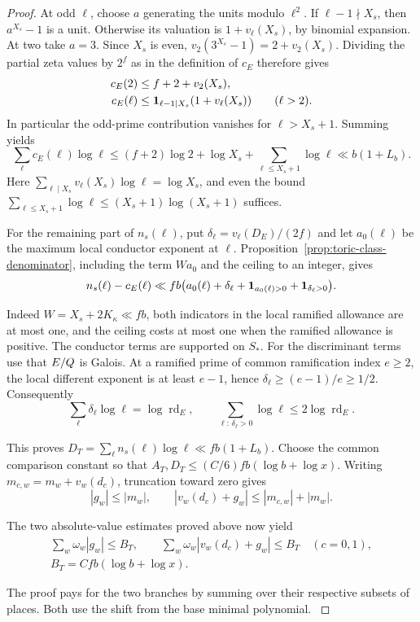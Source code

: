\begin{proof}
At odd \(\ell\), choose \(a\) generating the units modulo \(\ell^2\).
If \(\ell-1\nmid X_s\), then \(a^{X_s}-1\) is a unit. Otherwise
its valuation is \(1+v_\ell(X_s)\), by binomial expansion. At two
take \(a=3\). Since \(X_s\) is even,
\(v_2(3^{X_s}-1)=2+v_2(X_s)\). Dividing the partial zeta values
by \(2^f\) as in the definition of \(c_E\) therefore gives
\[
 \begin{split}
 c_E(2)&\le f+2+v_2(X_s),\\
 c_E(\ell)&\le {\bf1}_{\ell-1\mid X_s}(1+v_\ell(X_s))
                   \qquad(\ell>2).
 \end{split}
\]
In particular the odd-prime contribution vanishes for
\(\ell>X_s+1\). Summing yields
\[
 \sum_\ell c_E(\ell)\log\ell
 \le (f+2)\log2 + \log X_s+\sum_{\ell\le X_s+1}\log\ell
 \ll b(1+L_b).
\]
Here \(\sum_{\ell\mid X_s}v_\ell(X_s)\log\ell=\log X_s\), and
even the bound \(\sum_{\ell\le X_s+1}\log\ell\le(X_s+1)\log(X_s+1)\)
suffices.

For the remaining part of \(n_s(\ell)\), put
\(\delta_\ell=v_\ell(D_E)/(2f)\) and let \(a_0(\ell)\) be the
maximum local conductor exponent at \(\ell\).
Proposition~\ref{prop:toric-class-denominator}, including the term
\(Wa_0\) and the ceiling to an integer, gives
\[
 n_s(\ell)-c_E(\ell)\ll
 fb\bigl(a_0(\ell)+\delta_\ell+
 {\bf1}_{a_0(\ell)>0}+{\bf1}_{\delta_\ell>0}\bigr).
\]

Indeed \(W=X_s+2K_\kappa\ll fb\), both indicators in the local
ramified allowance are at most one, and the ceiling costs at most one
when the ramified allowance is positive. The conductor terms are
supported on \(S_*\). For the discriminant terms use that \(E/Q\)
is Galois. At a ramified prime of common ramification index
\(e\ge2\), the local different exponent is at least \(e-1\), hence
\(\delta_\ell\ge(e-1)/e\ge1/2\). Consequently
\[
 \sum_\ell \delta_\ell\log\ell=\log\operatorname{rd}_E,
 \qquad
 \sum_{\ell:\,\delta_\ell>0}\log\ell\le2\log\operatorname{rd}_E .
\]

This proves \(D_T=\sum_\ell n_s(\ell)\log\ell\ll fb(1+L_b)\).
Choose the common comparison constant so that
\(A_T,D_T\le(C/6)fb(\log b+\log x)\).
Writing \(m_{c,w}=m_w+v_w(d_c)\), truncation toward zero gives
\[
 |g_w|\le|m_w|,\qquad
 |v_w(d_c)+g_w|\le |m_{c,w}|+|m_w|.
\]

The two absolute-value estimates proved above now yield
\begin{equation}\label{eq:assigned-weighted-deletions}
 \begin{gathered}
  \sum_w\omega_w |g_w|\le B_T,\qquad
  \sum_w\omega_w|v_w(d_c)+g_w|\le B_T\quad(c=0,1),\\
  B_T=Cfb(\log b+\log x).
 \end{gathered}
\end{equation}

The proof pays for the two branches by summing over their
respective subsets of places. Both use the shift from the
base minimal polynomial. \label{cor:fitted-square-ratios-6}

\end{proof}


